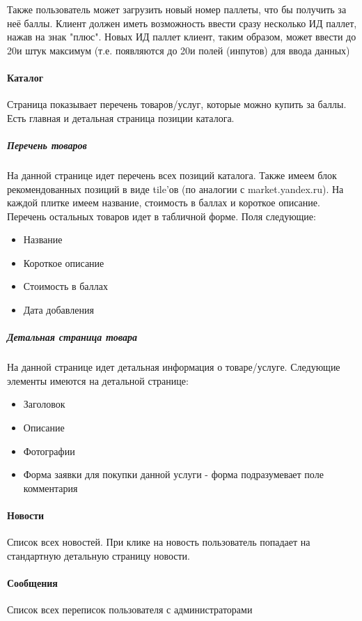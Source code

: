 \documentclass[DIV=calc, paper=a4, fontsize=11pt]{scrartcl} %
\begin{document}
Также пользователь может загрузить новый номер паллеты, что бы получить за неё баллы. Клиент должен иметь возможность ввести сразу несколько ИД паллет, нажав на знак "плюс". Новых ИД паллет клиент, таким образом, может ввести до 20и штук максимум (т.е. появляются до 20и полей (инпутов) для ввода данных)

\paragraph{Каталог}

Страница показывает перечень товаров/услуг, которые можно купить за баллы. Есть главная и детальная страница позиции каталога.

\subparagraph{Перечень товаров}
На данной странице идет перечень всех позиций каталога.
Также имеем блок рекомендованных позиций в виде tile'ов (по аналогии с market.yandex.ru). На каждой плитке имеем название, стоимость в баллах и короткое описание.
\\[0.5cm]
Перечень остальных товаров идет в табличной форме. Поля следующие:

\begin{itemize}
	\item Название
	\item Короткое описание
	\item Стоимость в баллах
	\item Дата добавления
\end{itemize}

\subparagraph{Детальная страница товара}
На данной странице идет детальная информация о товаре/услуге. Следующие элементы имеются на детальной странице:

\begin{itemize}
	\item Заголовок
	\item Описание
	\item Фотографии
	\item Форма заявки для покупки данной услуги - форма подразумевает поле комментария
\end{itemize}

\paragraph{Новости}
Список всех новостей. При клике на новость пользователь попадает на стандартную детальную страницу новости.

\paragraph{Сообщения}
Список всех переписок пользователя с администраторами
\end{document}
